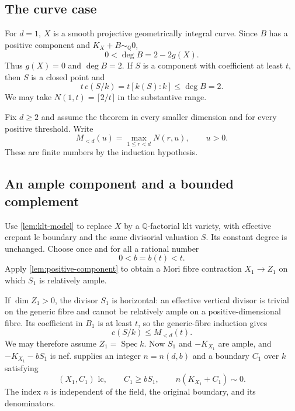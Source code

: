 \documentclass[11pt]{article}
\numberwithin{equation}{section}
\theoremstyle{definition}
\newcommand{\Q}{\mathbb Q}
\newcommand{\Spec}{\operatorname{Spec}}
\newcommand{\simq}{\sim_{\Q}}
\newcommand{\cdeg}[2]{c(#1/#2)}
\begin{document}
\subsection{The curve case}

For $d=1$, $X$ is a smooth projective geometrically integral curve.
Since $B$ has a positive component and $K_X+B\simq0$,
\[
 0<\deg B=2-2g(X).
\]
Thus $g(X)=0$ and $\deg B=2$. If $S$ is a component with coefficient
at least $t$, then $S$ is a closed point and
\[
 t\,\cdeg{S}{k}=t[k(S):k]\leq\deg B=2.
\]
We may take $N(1,t)=\lceil2/t\rceil$ in the substantive range.

Fix $d\geq2$ and assume the theorem in every smaller dimension and
for every positive threshold. Write
\begin{equation}\label{eq:Mnotation}
 M_{<d}(u)=\max_{1\leq r<d}N(r,u),\qquad u>0.
\end{equation}
These are finite numbers by the induction hypothesis.

\subsection{An ample component and a bounded complement}

Use \cref{lem:klt-model} to replace $X$ by a $\Q$-factorial klt
variety, with effective crepant lc boundary and the same divisorial
valuation $S$. Its constant degree is unchanged. Choose once and
for all a rational number
\begin{equation}\label{eq:bchoice}
 0<b=b(t)<t.
\end{equation}
Apply \cref{lem:positive-component} to obtain a Mori fibre contraction
$X_1\to Z_1$ on which $S_1$ is relatively ample.

If $\dim Z_1>0$, the divisor $S_1$ is horizontal: an effective
vertical divisor is trivial on the generic fibre and cannot be
relatively ample on a positive-dimensional fibre. Its coefficient
in $B_1$ is at least $t$, so the generic-fibre induction gives
\begin{equation}\label{eq:first-horizontal}
 \cdeg{S}{k}\leq M_{<d}(t).
\end{equation}
We may therefore assume $Z_1=\Spec k$. Now $S_1$ and $-K_{X_1}$ are
ample, and $-K_{X_1}-bS_1$ is nef.  supplies an
integer $n=n(d,b)$ and a boundary $C_1$ over $k$ satisfying
\begin{equation}\label{eq:C1}
 (X_1,C_1)\text{ lc},\qquad C_1\geq bS_1,
 \qquad n(K_{X_1}+C_1)\sim0.
\end{equation}
The index $n$ is independent of the field, the original boundary,
and its denominators.
\end{document}
